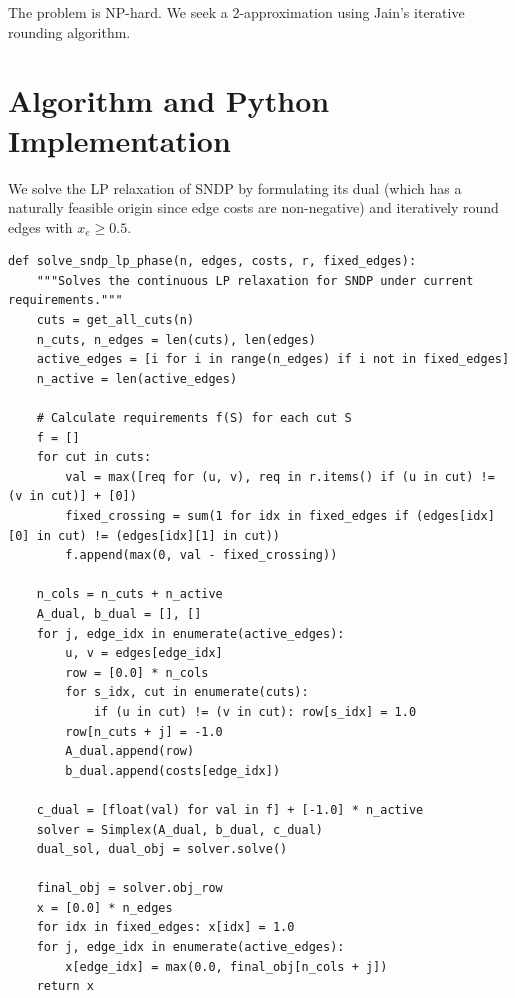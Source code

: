 \documentclass[11pt,oneside]{book}
\begin{document}
The problem is NP-hard. We seek a 2-approximation using Jain's iterative rounding algorithm.

\section{Algorithm and Python Implementation}
We solve the LP relaxation of SNDP by formulating its dual (which has a naturally feasible origin since edge costs are non-negative) and iteratively round edges with $x_e \ge 0.5$.

\begin{lstlisting}[style=python, caption=Jain's Iterative Rounding Algorithm]
def solve_sndp_lp_phase(n, edges, costs, r, fixed_edges):
    """Solves the continuous LP relaxation for SNDP under current requirements."""
    cuts = get_all_cuts(n)
    n_cuts, n_edges = len(cuts), len(edges)
    active_edges = [i for i in range(n_edges) if i not in fixed_edges]
    n_active = len(active_edges)
    
    # Calculate requirements f(S) for each cut S
    f = []
    for cut in cuts:
        val = max([req for (u, v), req in r.items() if (u in cut) != (v in cut)] + [0])
        fixed_crossing = sum(1 for idx in fixed_edges if (edges[idx][0] in cut) != (edges[idx][1] in cut))
        f.append(max(0, val - fixed_crossing))
        
    n_cols = n_cuts + n_active
    A_dual, b_dual = [], []
    for j, edge_idx in enumerate(active_edges):
        u, v = edges[edge_idx]
        row = [0.0] * n_cols
        for s_idx, cut in enumerate(cuts):
            if (u in cut) != (v in cut): row[s_idx] = 1.0
        row[n_cuts + j] = -1.0
        A_dual.append(row)
        b_dual.append(costs[edge_idx])
        
    c_dual = [float(val) for val in f] + [-1.0] * n_active
    solver = Simplex(A_dual, b_dual, c_dual)
    dual_sol, dual_obj = solver.solve()
    
    final_obj = solver.obj_row
    x = [0.0] * n_edges
    for idx in fixed_edges: x[idx] = 1.0
    for j, edge_idx in enumerate(active_edges):
        x[edge_idx] = max(0.0, final_obj[n_cols + j])
    return x
\end{lstlisting}
\end{document}

